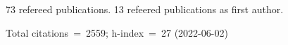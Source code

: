 73 refereed publications. 13 refeered publications as first author.

Total citations~=~2559; h-index~=~27 (2022-06-02)